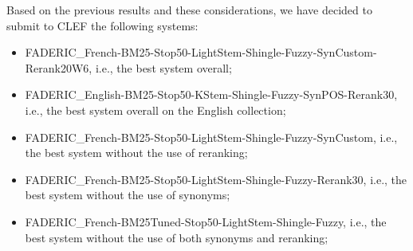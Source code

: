 Based on the previous results and these considerations, we have decided to submit to \ac{CLEF} the following systems:
\begin{itemize}
	\item FADERIC\_French-BM25-Stop50-LightStem-Shingle-Fuzzy-SynCustom-Rerank20W6, i.e., the best system overall;
	\item FADERIC\_English-BM25-Stop50-KStem-Shingle-Fuzzy-SynPOS-Rerank30, i.e., the best system overall on the English collection;
	\item FADERIC\_French-BM25-Stop50-LightStem-Shingle-Fuzzy-SynCustom, i.e., the best system without the use of reranking;
	\item FADERIC\_French-BM25-Stop50-LightStem-Shingle-Fuzzy-Rerank30, i.e., the best system without the use of synonyms;
	\item FADERIC\_French-BM25Tuned-Stop50-LightStem-Shingle-Fuzzy, i.e., the best system without the use of both synonyms and reranking;

\end{itemize}
